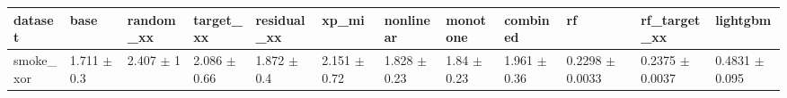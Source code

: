 \begin{tabular}{llllllllllll}
\toprule
dataset & base & random\_xx & target\_xx & residual\_xx & xp\_mi & nonlinear & monotone & combined & rf & rf\_target\_xx & lightgbm \\
\midrule
smoke\_xor & 1.711 $\pm$ 0.3 & 2.407 $\pm$ 1 & 2.086 $\pm$ 0.66 & 1.872 $\pm$ 0.4 & 2.151 $\pm$ 0.72 & 1.828 $\pm$ 0.23 & 1.84 $\pm$ 0.23 & 1.961 $\pm$ 0.36 & 0.2298 $\pm$ 0.0033 & 0.2375 $\pm$ 0.0037 & 0.4831 $\pm$ 0.095 \\
\bottomrule
\end{tabular}
